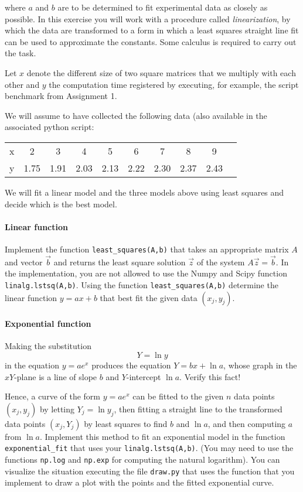 \documentclass[a4paper,10pt]{article}
\begin{document}
where $a$ and $b$ are to be determined to fit experimental data as
closely as possible. In this exercise you will work with a procedure
called \emph{linearization}, by which the data are transformed to a form
in which a least squares straight line fit can be used to approximate
the constants. Some calculus is required to carry out the task.


Let $x$ denote the different size of two square matrices that we
multiply with each other and $y$ the computation time registered by
executing, for example, the script benchmark from Assignment 1.

We will assume to have collected the following data (also available in
the associated python script:

\begin{table}[h]
  \centering
  \begin{tabular}{l|*{9}{c}}
    x&2&3&4&5&6&7&8&9\\
    y&1.75&1.91&2.03&2.13&2.22&2.30&2.37&2.43
  \end{tabular}
\end{table}
    
We will fit a linear model and the three models above using least
squares and decide which is the best model.



\paragraph{Linear function} Implement the function
\lstinline{least_squares(A,b)} that takes an appropriate matrix $A$ and
vector $\vec b$ and returns the least square solution $\vec z$ of the
system $A\vec z=\vec b$. In the implementation, you are not allowed to
use the Numpy and Scipy function \lstinline{linalg.lstsq(A,b)}.
Using the function \lstinline{least_squares(A,b)} determine the linear
function $y=ax + b$ that best fit the given data $(x_j,y_j)$.


\paragraph{Exponential function}
Making the substitution \[Y=\ln y\] in the equation $y=ae^x$ produces the
equation $Y=bx+\ln a$, whose graph in the $xY$-plane is a line of slope
$b$ and $Y$-intercept $\ln a$.  Verify this fact!

Hence, a curve of the form $y=ae^x$ can be fitted to the given $n$ data
points $(x_j,y_j)$ by letting $Y_j=\ln y_j$, then fitting a straight
line to the transformed data points $(x_j,Y_j)$ by least squares to find
$b$ and $\ln a$, and then computing $a$ from $\ln a$.  Implement this
method to fit an exponential model in the function
\lstinline{exponential_fit} that uses your
\lstinline{linalg.lstsq(A,b)}. (You may need to use the functions
\lstinline{np.log} and \lstinline{np.exp} for computing the natural
logarithm). You can visualize the situation executing the file
\lstinline{draw.py} that uses the function that you implement to draw a
plot with the points and the fitted exponential curve.
\end{document}
